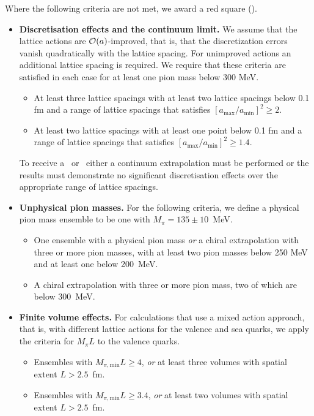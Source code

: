 Where the following criteria are not met, we award a red square (\rsquare).
\begin{itemize}
\item {\bfseries Discretisation effects and the continuum limit.} We assume that the lattice actions are
${\cal O}(a)$-improved, that is, that the discretization errors vanish quadratically with the lattice spacing. 
For unimproved actions an additional lattice spacing is required. We require that these
criteria are satisfied in each case for at least one pion mass below 300 MeV.
\begin{itemize}
\item[\bstar] At least three lattice spacings with at least two lattice spacings below 0.1 fm and
a range of lattice spacings that satisfies $[a_{\mathrm{max}}/a_{\mathrm{min}}]^2 \geq 2$.
\item[\bcirc] At least two lattice spacings with at least one point below 0.1 fm and a range of lattice spacings 
that satisfies $[a_{\mathrm{max}}/a_{\mathrm{min}}]^2 \geq 1.4$.
\end{itemize}
To receive a \bstar~or \bcirc~either a continuum extrapolation must be performed or the results must
demonstrate no significant discretisation effects over the appropriate range of lattice spacings.

\item {\bfseries Unphysical pion masses.} For the following criteria, we define a physical pion mass ensemble 
to be one with $M_\pi=135\pm 10$~MeV.
\begin{itemize}
\item[\bstar] One ensemble with a physical pion mass \emph{or} a chiral extrapolation with three or more pion masses,
with at least two pion masses below 250 MeV and at least one below 200~MeV.
\item[\bcirc] A chiral extrapolation with three or more pion mass, two of which are below 300~MeV.
\end{itemize}

\item {\bfseries Finite volume effects.} For calculations that use a mixed action approach, that is,
with different lattice actions for the valence and sea quarks, we apply the criteria for $M_\pi L$ to the valence quarks.
\begin{itemize}
\item[\bstar] Ensembles with $M_{\pi,\mathrm{min}}L\geq 4$, \emph{or} at least three volumes with spatial extent
$L>2.5$~fm.
\item[\bcirc] Ensembles with $M_{\pi,\mathrm{min}}L \geq 3.4$, \emph{or} at least two volumes with spatial extent
$L>2.5$~fm.
\end{itemize}


\end{itemize}
